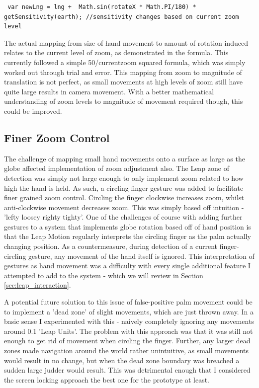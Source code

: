 \documentclass{sigplanconf}
\begin{document}
\begin{lstlisting}
 var newLng = lng +  Math.sin(rotateX * Math.PI/180) * getSensitivity(earth); //sensitivity changes based on current zoom level
\end{lstlisting}


The actual mapping from size of hand movement to amount of rotation induced relates to the current level of zoom, as demonstrated in the formula. This currently followed a simple 50/currentzoom squared formula, which was simply worked out through trial and error. This mapping from zoom to magnitude of translation is not perfect, as small movements at high levels of zoom still have quite large results in camera movement. With a better mathematical understanding of zoom levels to magnitude of movement required though, this could be improved. 

\subsection{Finer Zoom Control}

The challenge of mapping small hand movements onto a surface as large as the globe affected implementation of zoom adjustment also. The Leap zone of detection was simply not large enough to only implement zoom related to how high the hand is held. As such, a circling finger gesture was added to facilitate finer grained zoom control. Circling the finger clockwise increases zoom, whilst anti-clockwise movement decreases zoom. This was simply based off intuition - 'lefty loosey righty tighty'. One of the challenges of course with adding further gestures to a system that implements globe rotation based off of hand position is that the Leap Motion regularly interprets the circling finger as the palm actually changing position. As a countermeasure, during detection of a current finger-circling gesture, any movement of the hand itself is ignored. This interpretation of gestures as hand movement was a difficulty with every single additional feature I attempted to add to the system - which we will review in Section \ref{sec:leap_interaction}.

A potential future solution to this issue of false-positive palm movement could be to implement a 'dead zone' of slight movements, which are just thrown away. In a basic sense I experimented with this - naively completely ignoring any movements around 0.1 'Leap Units'. The problem with this approach was that it was still not enough to get rid of movement when circling the finger. Further, any larger dead zones made navigation around the world rather unintuitive, as small movements would result in no change, but when the dead zone boundary was breached a sudden large judder would result. This was detrimental enough that I considered the screen locking approach the best one for the prototype at least.
\end{document}
